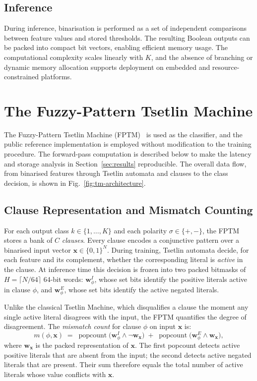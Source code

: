 \documentclass[journal,twoside,web]{ieeecolor}
\begin{document}
\subsection{Inference}
\label{subsec:inference}

During inference, binarisation is performed as a set of independent
comparisons between feature values and stored thresholds. The
resulting Boolean outputs can be packed into compact bit vectors,
enabling efficient memory usage. The computational complexity scales
linearly with $K$, and the absence of branching or dynamic memory
allocation supports deployment on embedded and resource-constrained
platforms.


\section{The Fuzzy-Pattern Tsetlin Machine}
\label{sec:fptm}
The Fuzzy-Pattern Tsetlin Machine (FPTM)~\cite{hnilov2025fptm} is
used as the classifier, and the public reference implementation is
employed without modification to the training procedure. The
forward-pass computation is described below to make the latency and
storage analysis in Section~\ref{sec:results} reproducible. The
overall data flow, from binarised features through Tsetlin automata
and clauses to the class decision, is shown in
Fig.~\ref{fig:tm-architecture}.

\subsection{Clause Representation and Mismatch Counting}
\label{sec:fptm-clause}
For each output class $k \in \{1,\ldots,K\}$ and each polarity
$\sigma \in \{+,-\}$, the FPTM stores a bank of $C$ \emph{clauses}.
Every clause encodes a conjunctive pattern over a binarised input
vector $\mathbf{x} \in \{0,1\}^{N}$.  During training, Tsetlin
automata decide, for each feature and its complement, whether the
corresponding literal is \emph{active} in the clause.  At inference
time this decision is frozen into two packed bitmasks of
$H = \lceil N/64 \rceil$ 64-bit words:
$\mathbf{w}^{I}_{\phi}$, whose set bits identify the positive
literals active in clause $\phi$, and
$\mathbf{w}^{E}_{\phi}$, whose set bits identify the active
negated literals.

Unlike the classical Tsetlin Machine, which disqualifies a clause
the moment any single active literal disagrees with the input, the
FPTM quantifies the degree of disagreement.  The
\emph{mismatch count} for clause $\phi$ on input $\mathbf{x}$ is:
%
\begin{equation}
  m(\phi,\mathbf{x})
  \;=\;
  \operatorname{popcount}\!\bigl(
      \mathbf{w}^{I}_{\phi} \wedge \neg\mathbf{w}_{\mathbf{x}}
  \bigr)
  \;+\;
  \operatorname{popcount}\!\bigl(
      \mathbf{w}^{E}_{\phi} \wedge \mathbf{w}_{\mathbf{x}}
  \bigr),
  \label{eq:mismatch}
\end{equation}
%
where $\mathbf{w}_{\mathbf{x}}$ is the packed representation of
$\mathbf{x}$. The first popcount detects active positive literals
that are absent from the input; the second detects active negated
literals that are present. Their sum therefore equals the total
number of active literals whose value conflicts with $\mathbf{x}$.
\end{document}
